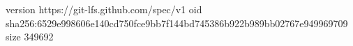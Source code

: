 version https://git-lfs.github.com/spec/v1
oid sha256:6529e998606e140cd750fce9bb7f144bd745386b922b989bb02767e949969709
size 349692
